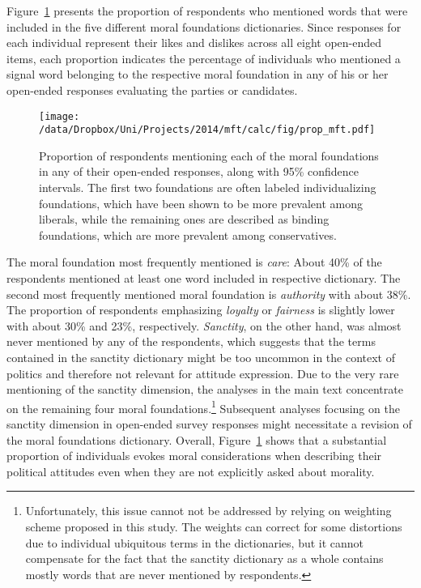 Figure~\ref{fig:prop_ideol} presents the proportion of respondents who mentioned words that were included in the five different moral foundations dictionaries. Since responses for each individual represent their likes and dislikes across all eight open-ended items, each proportion indicates the percentage of individuals who mentioned a signal word belonging to the respective moral foundation in any of his or her open-ended responses evaluating the parties or candidates.

\begin{figure}[ht]\centering
\texttt{[image: /data/Dropbox/Uni/Projects/2014/mft/calc/fig/prop\_mft.pdf]}
\caption[Proportion of respondents mentioning each of the moral foundations in any of their open-ended responses (2012 ANES)]{Proportion of respondents mentioning each of the moral foundations in any of their open-ended responses, along with 95\% confidence intervals. The first two foundations are often labeled individualizing foundations, which have been shown to be more prevalent among liberals, while the remaining ones are described as binding foundations, which are more prevalent among conservatives.}\label{fig:prop_ideol}
\end{figure}

The moral foundation most frequently mentioned is \textit{care}: About 40\% of the respondents mentioned at least one word included in respective dictionary. The second most frequently mentioned moral foundation is \textit{authority} with about 38\%. The proportion of respondents emphasizing \textit{loyalty} or \textit{fairness} is slightly lower with about 30\% and 23\%, respectively. \textit{Sanctity}, on the other hand, was almost never mentioned by any of the respondents, which suggests that the terms contained in the sanctity dictionary might be too uncommon in the context of politics and therefore not relevant for attitude expression. Due to the very rare mentioning of the sanctity dimension, the analyses in the main text concentrate on the remaining four moral foundations.\footnote{Unfortunately, this issue cannot not be addressed by relying on weighting scheme proposed in this study. The weights can correct for some distortions due to individual ubiquitous terms in the dictionaries, but it cannot compensate for the fact that the sanctity dictionary as a whole contains mostly words that are never mentioned by respondents.} Subsequent analyses focusing on the sanctity dimension in open-ended survey responses might necessitate a revision of the moral foundations dictionary. Overall, Figure~\ref{fig:prop_ideol} shows that a substantial proportion of individuals evokes moral considerations when describing their political attitudes even when they are not explicitly asked about morality.

